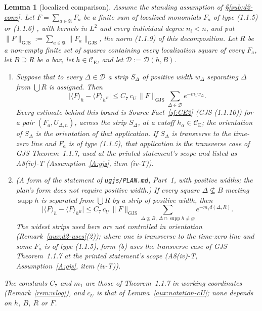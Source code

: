 \documentclass[11pt,a4paper]{article}
\theoremstyle{plain}
\newtheorem{lemma}[theorem]{Lemma}
\theoremstyle{definition}
\theoremstyle{plain}
\theoremstyle{definition}
\newcommand{\CE}{\mathcal{C}_{\mathrm E}}
\DeclareMathOperator{\supp}{supp}
\newcommand{\GJS}[1]{\lVert #1\rVert_{\mathrm{GJS}}}   %
\newcommand{\ev}[2]{\langle #1\rangle_{#2}}            %
\begin{document}
\begin{lemma}[localized comparison]\label{lem:D2}
Assume the standing assumption of \S\ref{sub:d2-conv}.  Let $F=\sum_{a\in\mathfrak A}F_a$ be a
finite sum of localized monomials $F_a$ of type (1.1.5) or (1.1.6) \cite[p.~593]{GJS}, with
kernels in $L^2$ and every individual degree $n_i<\bar n$, and put
$\GJS{F}:=\sum_{a\in\mathfrak A}\GJS{F_a}$, the norm (1.1.9) of this decomposition.  Let $R$
be a non-empty finite set of squares containing every localization square of every $F_a$, let
$B\supseteq R$ be a box, let $h\in\CE$, and let $\mathcal D:=\mathcal D(h,B)$.
\begin{enumerate}
\item[\rm(a)] Suppose that to every $\Delta\in\mathcal D$ a strip $S_\Delta$ of positive width
$w_\Delta$ separating $\Delta$ from $\bigcup R$ is assigned.  Then
\[
 \bigl|\ev{F}{h}-\ev{F}{h^B}\bigr|\le C_7\,c_U\,\GJS{F}\sum_{\Delta\in\mathcal D}e^{-m_1w_\Delta} .
\]
Every estimate behind this bound is Source Fact~\ref{sf:CE2} (GJS (1.1.10)) for a pair
$(F_a,U_{\Delta,n})$, across the strip $S_\Delta$, at a cutoff $h_\alpha\in\CE$; the
orientation of $S_\Delta$ is the orientation of that application.  If $S_\Delta$ is transverse
to the time-zero line and $F_a$ is of type (1.1.5), that application is the transverse case of
GJS Theorem~1.1.7, used at the printed statement's scope and listed as A8(iv)-T
(Assumption~\ref{A:gjs}, item (iv-T)).
\item[\rm(b)] (A form of the statement of \texttt{ugjs/PLAN.md}, Part~1, with positive widths;
the plan's form does not require positive width.)  If every square $\Delta\not\subseteq B$
meeting $\supp h$ is separated from $\bigcup R$ by a strip of positive width, then
\[
 \bigl|\ev{F}{h}-\ev{F}{h^B}\bigr|\le C_7\,c_U\,\GJS{F}
 \sum_{\Delta\not\subseteq B,\ \Delta\cap\supp h\ne\varnothing}e^{-m_1d(\Delta,R)} .
\]
The widest strips used here are not controlled in orientation
(Remark~\ref{aux:d2-uses}(2)); where one is transverse to the time-zero line and some $F_a$
is of type (1.1.5), form (b) uses the transverse case of GJS Theorem~1.1.7 at the printed
statement's scope (A8(iv)-T, Assumption~\ref{A:gjs}, item (iv-T)).
\end{enumerate}
The constants $C_7$ and $m_1$ are those of Theorem~1.1.7 in working coordinates (Remark~\ref{rem:wlog}), and $c_U$ is that of Lemma~\ref{aux:notation-cU}; none depends on $h$, $B$, $R$ or
$F$.
\end{lemma}
\end{document}
